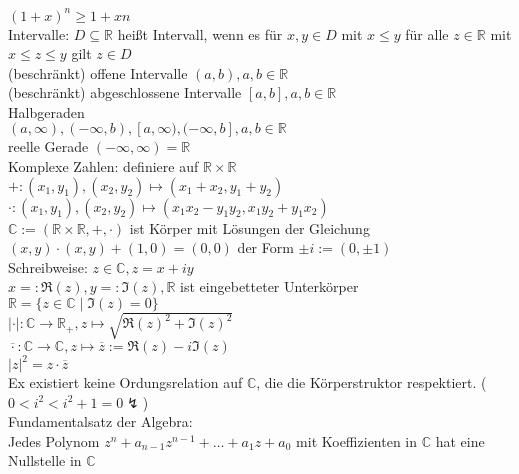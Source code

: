 \documentclass[9pt, landscape,a4paper]{extarticle}
\let\bar\overline
\newcommand*\abs[1]{\lvert#1\rvert}
\begin{document}
\begin{multicols*}{4}
  $(1 + x)^n \geq 1 + xn$ \\
  Intervalle: $D \subseteq \mathbb{R}$ heißt Intervall, wenn es für $x, y \in D$ mit $x \leq y$ für alle
  $z \in \mathbb{R}$ mit $x\leq z \leq y$ gilt $z\in D$ \\
  (beschränkt) offene Intervalle $(a, b), a, b \in \mathbb{R}$ \\
  (beschränkt) abgeschlossene Intervalle $[a, b], a, b\in\mathbb{R}$ \\
  Halbgeraden \\
  $(a, \infty), (-\infty, b), [a,\infty), (-\infty, b], a, b\in\mathbb{R}$ \\
  reelle Gerade $(-\infty, \infty) = \mathbb{R}$ \\
  Komplexe Zahlen: definiere auf $\mathbb{R} \times \mathbb{R}$ \\
  $+: (x_1, y_1), (x_2, y_2)\mapsto (x_1 + x_2, y_1 + y_2)$ \\
  $\cdot: (x_1, y_1), (x_2, y_2)\mapsto (x_1x_2  - y_1 y_2, x_1 y_2 + y_1 x_2)$ \\
  $\mathbb{C} := (\mathbb{R}\times\mathbb{R}, +, \cdot)$ ist Körper mit Lösungen der Gleichung \\
  $(x, y) \cdot (x, y) + (1,0) = (0,0)$ der Form $\pm i:= (0, \pm 1)$ \\
  Schreibweise: $z\in\mathbb{C}, z = x + i y$ \\
  $x =: \Re(z), y =: \Im(z), \mathbb{R}$ ist eingebetteter Unterkörper \\
  $\mathbb{R} = \{z \in \mathbb{C} \mid \Im(z) = 0\}$ \\
  $\abs{\cdot}: \mathbb{C} \to \mathbb{R}_{+}, z\mapsto \sqrt{\Re(z)^2 + \Im(z)^2}$ \\
  $\bar\cdot: \mathbb{C}\to\mathbb{C}, z\mapsto \bar z := \Re(z) - i\Im(z)$ \\
  $\abs{z}^2 = z\cdot\bar z$ \\
  Ex existiert keine Ordungsrelation auf $\mathbb{C}$, die die Körperstruktor respektiert. ($0 < i^2 < i^2 + 1 = 0 \lightning$) \\
  Fundamentalsatz der Algebra: \\
  Jedes Polynom $z^n + a_{n - 1}z^{n - 1} + \dots + a_1 z + a_0$ mit Koeffizienten in $\mathbb{C}$ hat eine Nullstelle in $\mathbb{C}$

\end{multicols*}
\end{document}
